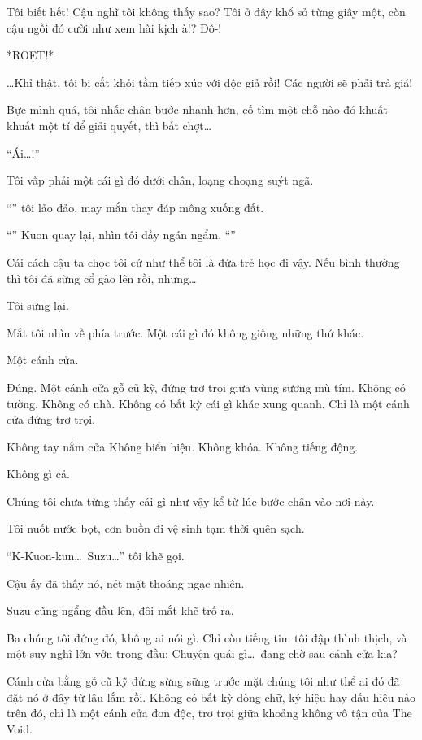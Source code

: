 \documentclass[../main.tex]{subfiles}
\begin{document}
Tôi biết hết! Cậu nghĩ tôi không thấy sao? Tôi ở đây khổ sở từng giây một, còn cậu ngồi đó cười như xem hài kịch à!? Đồ-!

*ROẸT!*

\dots Khỉ thật, tôi bị cắt khỏi tầm tiếp xúc với độc giả rồi! Các người sẽ phải trả giá!

Bực mình quá, tôi nhấc chân bước nhanh hơn, cố tìm một chỗ nào đó khuất khuất một tí để giải quyết, thì bất chợt\dots

\il

``Ái\dots!''

Tôi vấp phải một cái gì đó dưới chân, loạng choạng suýt ngã.

``'' tôi lảo đảo, may mắn thay đáp mông xuống đất.

``'' Kuon quay lại, nhìn tôi đầy ngán ngẩm. ``''

Cái cách cậu ta chọc tôi cứ như thể tôi là đứa trẻ học đi vậy. Nếu bình thường thì tôi đã sừng cổ gào lên rồi, nhưng\dots

Tôi sững lại.

Mắt tôi nhìn về phía trước. Một cái gì đó không giống những thứ khác.

Một cánh cửa.

Đúng. Một cánh cửa gỗ cũ kỹ, đứng trơ trọi giữa vùng sương mù tím. Không có tường. Không có nhà. Không có bất kỳ cái gì khác xung quanh. Chỉ là một cánh cửa đứng trơ trọi.

Không tay nắm cửa Không biển hiệu. Không khóa. Không tiếng động.

Không gì cả.

Chúng tôi chưa từng thấy cái gì như vậy kể từ lúc bước chân vào nơi này.

Tôi nuốt nước bọt, cơn buồn đi vệ sinh tạm thời quên sạch.

``K-Kuon-kun\dots\ Suzu\dots'' tôi khẽ gọi.

Cậu ấy đã thấy nó, nét mặt thoáng ngạc nhiên.

Suzu cũng ngẩng đầu lên, đôi mắt khẽ trố ra.

Ba chúng tôi đứng đó, không ai nói gì. Chỉ còn tiếng tim tôi đập thình thịch, và một suy nghĩ lởn vởn trong đầu: Chuyện quái gì\dots\ đang chờ sau cánh cửa kia?


Cánh cửa bằng gỗ cũ kỹ đứng sừng sững trước mặt chúng tôi như thể ai đó đã đặt nó ở đây từ lâu lắm rồi. Không có bất kỳ dòng chữ, ký hiệu hay dấu hiệu nào trên đó, chỉ là một cánh cửa đơn độc, trơ trọi giữa khoảng không vô tận của The Void.
\end{document}
